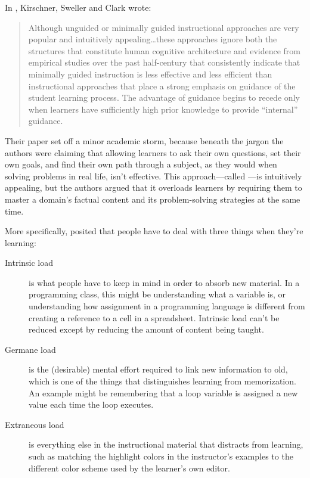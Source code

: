 
In \cite{Kirs2006}, Kirschner, Sweller and Clark wrote:

\begin{quote}

Although unguided or minimally guided instructional approaches are
very popular and intuitively appealing{\ldots}these approaches
ignore both the structures that constitute human cognitive
architecture and evidence from empirical studies over the past
half-century that consistently indicate that minimally guided
instruction is less effective and less efficient than instructional
approaches that place a strong emphasis on guidance of the student
learning process. The advantage of guidance begins to recede only when
learners have sufficiently high prior knowledge to provide ``internal''
guidance.

\end{quote}

Their paper set off a minor academic storm, because beneath the jargon
the authors were claiming that allowing learners to ask their own
questions, set their own goals, and find their own path through a
subject, as they would when solving problems in real life, isn't
effective. This approach---called
---is
intuitively appealing, but the authors argued that it overloads learners
by requiring them to master a domain's factual content and its
problem-solving strategies at the same time.

More specifically, 
posited that people have to deal with three things when they're
learning:

\begin{description}
\item[Intrinsic load]
is what people have to keep in mind in order to absorb new material.
In a programming class, this might be understanding what a variable
is, or understanding how assignment in a programming language is
different from creating a reference to a cell in a spreadsheet.
Intrinsic load can't be reduced except by reducing the amount of
content being taught.
\item[Germane load]
is the (desirable) mental effort required to link new information to
old, which is one of the things that distinguishes learning from
memorization. An example might be remembering that a loop variable
is assigned a new value each time the loop executes.
\item[Extraneous load]
is everything else in the instructional material that distracts from
learning, such as matching the highlight colors in the instructor's
examples to the different color scheme used by the learner's own
editor.
\end{description}

